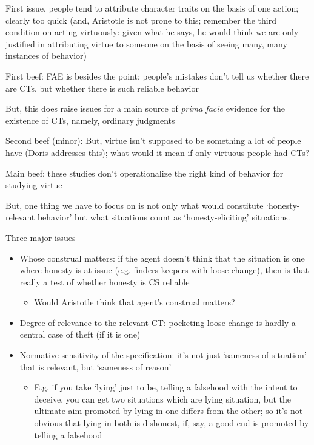 \documentclass[11pt]{article}
\begin{document}
\noindent First issue, people tend to attribute character traits on the basis of one action; clearly too quick (and, Aristotle is not prone to this; remember the third condition on acting virtuously: given what he says, he would think we are only justified in attributing virtue to someone on the basis of seeing many, many instances of behavior)
\vspace*{2mm}

\noindent First beef: FAE is besides the point; people's mistakes don't tell us whether there are CTs, but whether there is such reliable behavior
\vspace*{2mm}

\noindent But, this does raise issues for a main source of \emph{prima facie} evidence for the existence of CTs, namely, ordinary judgments
\vspace*{2mm}

\noindent Second beef (minor): But, virtue isn't supposed to be something a lot of people have (Doris addresses this); what would it mean if only virtuous people had CTs?
\vspace*{2mm}

\noindent Main beef: these studies don't operationalize the right kind of behavior for studying virtue
\vspace*{2mm}

\noindent But, one thing we have to focus on is not only what would constitute `honesty-relevant behavior' but what situations count as `honesty-eliciting' situations.
\vspace*{2mm}

\noindent Three major issues

\begin{itemize}\item{Whose construal matters: if the agent doesn't think that the situation is one where honesty is at issue (e.g. finders-keepers with loose change), then is that really a test of whether honesty is CS reliable}\begin{itemize}\item{Would Aristotle think that agent's construal matters?}\end{itemize}\item{Degree of relevance to the relevant CT: pocketing loose change is hardly a central case of theft (if it is one)}\item{Normative sensitivity of the specification: it's not just `sameness of situation' that is relevant, but `sameness of reason'}\begin{itemize}\item{E.g. if you take `lying' just to be, telling a falsehood with the intent to deceive, you can get two situations which are lying situation, but the ultimate aim promoted by lying in one differs from the other; so it's not obvious that lying in both is dishonest, if, say, a good end is promoted by telling a falsehood}\end{itemize}\end{itemize}
\end{document}
